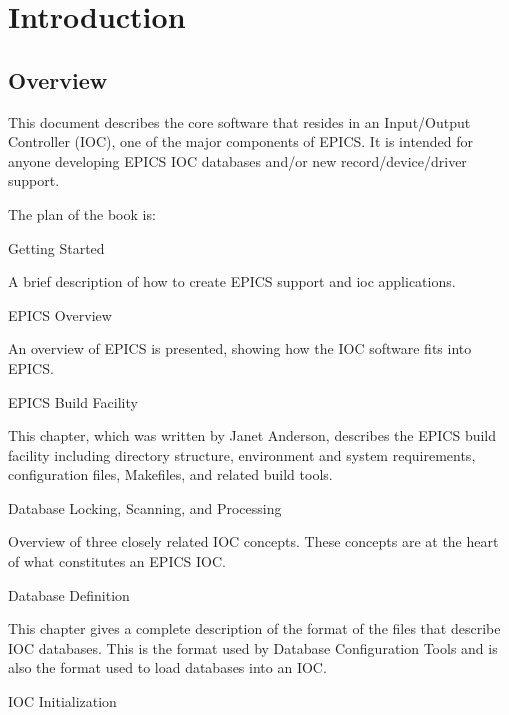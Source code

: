 \chapter{Introduction}

\section{Overview}

This document describes the core software that resides in an Input/Output Controller (IOC), one of the major components 
of EPICS. It is intended for anyone developing EPICS IOC databases and/or new record/device/driver support.

The plan of the book is:

Getting Started

\begin{description}\item A brief description of how to create EPICS support and ioc applications.

\end{description}EPICS Overview

\begin{description}\item An overview of EPICS is presented, showing how the IOC software fits into EPICS.

\end{description}EPICS Build Facility

\begin{description}\item This chapter, which was written by Janet Anderson, describes the EPICS build facility including directory 
structure, environment and system requirements, configuration files, Makefiles, and related build tools.

\end{description}Database Locking, Scanning, and Processing

\begin{description}\item Overview of three closely related IOC concepts. These concepts are at the heart of what constitutes an EPICS IOC.

\end{description}Database Definition

\begin{description}\item This chapter gives a complete description of the format of the files that describe IOC databases. This is the format 
used by Database Configuration Tools and is also the format used to load databases into an IOC.

\end{description}IOC Initialization

